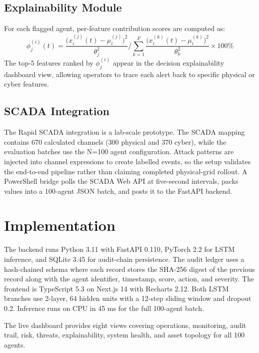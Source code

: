 \documentclass[conference,a4paper]{IEEEtran}
\begin{document}
\subsection{Explainability Module}

For each flagged agent, per-feature contribution scores are computed as:
\begin{equation}
\phi_j^{(i)}(t) = \frac{\bigl(x_i^{(j)}(t) - \mu_i^{(j)}\bigr)^2}{\theta_j^2} \Bigg/ \sum_{k=1}^{F} \frac{\bigl(x_i^{(k)}(t) - \mu_i^{(k)}\bigr)^2}{\theta_k^2} \times 100\%
\label{eq:explain}
\end{equation}
The top-5 features ranked by $\phi_j^{(i)}$ appear in the decision explainability dashboard view, allowing operators to trace each alert back to specific physical or cyber features.

\subsection{SCADA Integration}

The Rapid SCADA integration is a lab-scale prototype. The SCADA mapping contains 670 calculated channels (300 physical and 370 cyber), while the evaluation batches use the N=100 agent configuration. Attack patterns are injected into channel expressions to create labelled events, so the setup validates the end-to-end pipeline rather than claiming completed physical-grid rollout. A PowerShell bridge polls the SCADA Web API at five-second intervals, packs values into a 100-agent JSON batch, and posts it to the FastAPI backend.

\section{Implementation}

The backend runs Python 3.11 with FastAPI 0.110, PyTorch 2.2 for LSTM inference, and SQLite 3.45 for audit-chain persistence. The audit ledger uses a hash-chained schema where each record stores the SHA-256 digest of the previous record along with the agent identifier, timestamp, score, action, and severity. The frontend is TypeScript 5.3 on Next.js 14 with Recharts 2.12. Both LSTM branches use 2-layer, 64 hidden units with a 12-step sliding window and dropout 0.2. Inference runs on CPU in 45 ms for the full 100-agent batch.

The live dashboard provides eight views covering operations, monitoring, audit trail, risk, threats, explainability, system health, and asset topology for all 100 agents.
\end{document}
